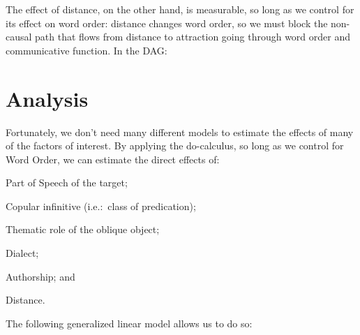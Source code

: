\documentclass[a4paper, 12pt, article]{memoir}
\begin{document}
The effect of distance, on the other hand, is measurable, so long as we control
for its effect on word order: distance changes word order, so we must block the
non\hyp{}causal path that flows from distance to attraction going through word
order and communicative function.
In the DAG\@:




\chapter{Analysis} %

Fortunately, we don't need many different models to estimate the effects of many
of the factors of interest.
By applying the do-calculus, so long as we control for Word Order, we can
estimate the direct effects of:
\begin{inparaenum}
  \item Part of Speech of the target;
  \item Copular infinitive (i.e.:\ class of predication);
  \item Thematic role of the oblique object;
  \item Dialect;
  \item Authorship; and
  \item Distance.
\end{inparaenum}
The following generalized linear model allows us to do so:
\end{document}
